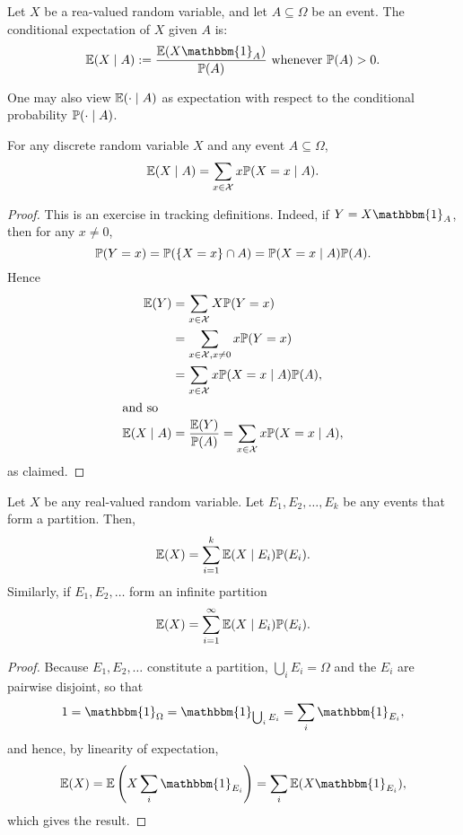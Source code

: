 \documentclass[10pt, a4paper]{article}
\newcommand{\ind}[1][A]{\mathbbm{1}_{#1}}
\begin{document}
\begin{definition}
    Let $X$ be a rea-valued random variable,
    and let $A \subseteq \Omega$ be an event.
    The conditional expectation of $X$ given $A$ is:
    \[
    \E(X \mid A) := \frac{\E(X\ind)}{\P(A)}\text{ whenever $\P(A) > 0$}.
    \]
\end{definition}

One may also view $\E(\cdot\mid A)$ as expectation with respect to the conditional probability $\P(\cdot\mid A)$.
\begin{theorem}
    For any discrete random variable $X$ and any event $A \subseteq \Omega$,
    \[
    \E(X\mid A) = \sum_{x \in \mathcal{X}}x\P(X = x\mid A).
    \]
    \begin{proof}
        This is an exercise in tracking definitions.
        Indeed,
        if $Y = X\ind$,
        then for any $x \neq 0$,
        \[
        \P(Y = x) = \P(\{X = x\} \cap A) = \P(X = x\mid A)\P(A).
        \]
        Hence
        \begin{align*}
            \E(Y) &= \sum_{x \in \mathcal{X}}X\P(Y = x) \\
            &= \sum_{x \in \mathcal{X}, x \neq 0}x\P(Y = x) \\
            &= \sum_{x \in \mathcal{X}}x\P(X = x\mid A)\P(A), \\
            \intertext{and so}
            \E(X \mid A) &= \frac{\E(Y)}{\P(A)} = \sum_{x \in \mathcal{X}}x\P(X = x\mid A),
        \end{align*}
        as claimed.
    \end{proof}
\end{theorem}

\begin{theorem}
    Let $X$ be any real-valued random variable.
    Let $E_1, E_2, \dotsc, E_k$ be any events that form a partition.
    Then,
    \[
    \E(X) = \sum_{i = 1}^{k}\E(X \mid E_i)\P(E_i).
    \]
    Similarly,
    if $E_1, E_2, \dotsc$ form an infinite partition
    \[
    \E(X) = \sum_{i = 1}^{\infty}\E(X \mid E_i)\P(E_i).
    \]
    \begin{proof}
        Because $E_1, E_2, \dotsc$ constitute a partition,
        $\bigcup_iE_i = \Omega$ and the $E_i$ are pairwise disjoint,
        so that
        \[
        1 = \ind[\Omega] = \ind[\bigcup_iE_i] = \sum_{i}\ind[E_i],
        \]
        and hence,
        by linearity of expectation,
        \[
        \E(X) = \E\left(X\sum_{i}\ind[E_i]\right) = \sum_{i}\E(X\ind[E_i]),
        \]
        which gives the result.
    \end{proof}
\end{theorem}
\end{document}
